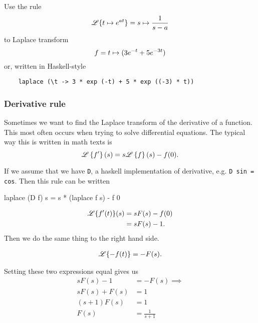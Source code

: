\begin{example}
    Use the rule 
\begin{equation*}
    \mathscr{L} \{ t \mapsto e^{at}\} =  s \mapsto \frac{1}{s-a}
\end{equation*}
    to Laplace transform 
\begin{equation*}
    f =  t \mapsto (3e^{-t} + 5 e^{-3t})
\end{equation*}
or, written in Haskell-style
\begin{verbatim}
    laplace (\t -> 3 * exp (-t) + 5 * exp ((-3) * t)) 
\end{verbatim} 
\end{example}
\begin{solution}

\end{solution} 

\subsubsection{Derivative rule} 
Sometimes we want to find the Laplace transform of the derivative of a function. This most often occurs when trying to solve differential equations. The typical way this is written in math texts is
\begin{equation*}
    \mathscr{L} \left\{f'\right\}(s) = s \mathscr{L} \left\{f\right\}(s) - f(0). 
\end{equation*}

If we assume that we have \verb|D|, a haskell implementation of derivative, e.g. \verb|D sin = cos|.
Then this rule can be written

\begin{codeeq}
    laplace (D f) s = s * (laplace f s) - f 0
\end{codeeq}

\iffalse 
\begin{align*} 
    \mathscr{L} \{ f'(t) \}(s) &= s F(s) - f(0) \\ 
                         &= s F(s) - 1. 
\end{align*} 
Then we do the same thing to the right hand side. 

\begin{align*} 
    \mathscr{L} \{- f(t)\} = - F(s).
\end{align*} 

Setting these two expressions equal gives us
\begin{align*} 
     s F(s) - 1 &= - F(s) \implies{} \\ 
     s F(s) + F(s) &= 1  \\
     (s+1) F(s) &= 1  \\
     F(s) &= \frac{1}{s+1}
\end{align*} 

